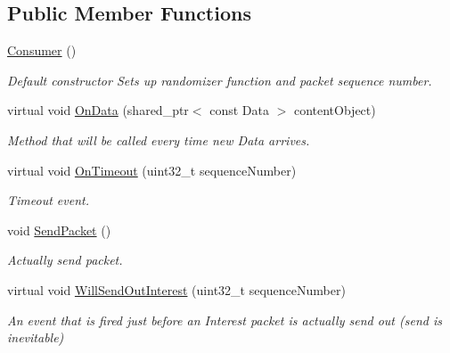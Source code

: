 \subsection*{Public Member Functions}
\begin{DoxyCompactItemize}
\item 
\hyperlink{classns3_1_1ndn_1_1Consumer_a5f4e5baddcb70c734c3c92e7bb4d6f38}{Consumer} ()\hypertarget{classns3_1_1ndn_1_1Consumer_a5f4e5baddcb70c734c3c92e7bb4d6f38}{}\label{classns3_1_1ndn_1_1Consumer_a5f4e5baddcb70c734c3c92e7bb4d6f38}

\begin{DoxyCompactList}\small\item\em Default constructor Sets up randomizer function and packet sequence number. \end{DoxyCompactList}\item 
virtual void \hyperlink{classns3_1_1ndn_1_1Consumer_a1d32a655a013ce7404a1ce7fe4eb2dad}{On\+Data} (shared\+\_\+ptr$<$ const Data $>$ content\+Object)
\begin{DoxyCompactList}\small\item\em Method that will be called every time new Data arrives. \end{DoxyCompactList}\item 
virtual void \hyperlink{classns3_1_1ndn_1_1Consumer_acdd845fd285cd7d63ea87c2e2dfa3234}{On\+Timeout} (uint32\+\_\+t sequence\+Number)
\begin{DoxyCompactList}\small\item\em Timeout event. \end{DoxyCompactList}\item 
void \hyperlink{classns3_1_1ndn_1_1Consumer_a82bc08b788c5e168774664806729c4f4}{Send\+Packet} ()\hypertarget{classns3_1_1ndn_1_1Consumer_a82bc08b788c5e168774664806729c4f4}{}\label{classns3_1_1ndn_1_1Consumer_a82bc08b788c5e168774664806729c4f4}

\begin{DoxyCompactList}\small\item\em Actually send packet. \end{DoxyCompactList}\item 
virtual void \hyperlink{classns3_1_1ndn_1_1Consumer_a61f73750ef40b39a7f4f15cd952bb36a}{Will\+Send\+Out\+Interest} (uint32\+\_\+t sequence\+Number)
\begin{DoxyCompactList}\small\item\em An event that is fired just before an Interest packet is actually send out (send is inevitable) \end{DoxyCompactList}\end{DoxyCompactItemize}
